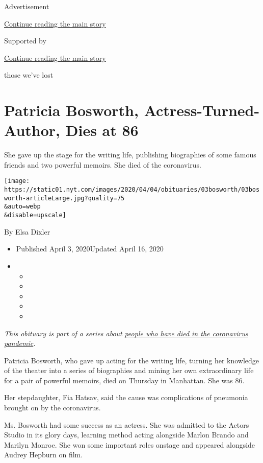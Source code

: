 Advertisement

\protect\hyperlink{after-top}{Continue reading the main story}

Supported by

\protect\hyperlink{after-sponsor}{Continue reading the main story}

those we've lost

\hypertarget{patricia-bosworth-actress-turned-author-dies-at-86}{%
\section{Patricia Bosworth, Actress-Turned-Author, Dies at
86}\label{patricia-bosworth-actress-turned-author-dies-at-86}}

She gave up the stage for the writing life, publishing biographies of
some famous friends and two powerful memoirs. She died of the
coronavirus.

\texttt{[image: https://static01.nyt.com/images/2020/04/04/obituaries/03bosworth/03bosworth-articleLarge.jpg?quality=75\\\&auto=webp\\\&disable=upscale]}

By Elsa Dixler

\begin{itemize}
\item
  Published April 3, 2020Updated April 16, 2020
\item
  \begin{itemize}
  \item
  \item
  \item
  \item
  \item
  \end{itemize}
\end{itemize}

\emph{This obituary is part of a series about}
\href{https://www.nytimes.com/series/people-who-have-died-of-the-coronavirus}{\emph{people
who have died in the coronavirus pandemic}}\emph{.}

Patricia Bosworth, who gave up acting for the writing life, turning her
knowledge of the theater into a series of biographies and mining her own
extraordinary life for a pair of powerful memoirs, died on Thursday in
Manhattan. She was 86.

Her stepdaughter, Fia Hatsav, said the cause was complications of
pneumonia brought on by the coronavirus.

Ms. Bosworth had some success as an actress. She was admitted to the
Actors Studio in its glory days, learning method acting alongside Marlon
Brando and Marilyn Monroe. She won some important roles onstage and
appeared alongside Audrey Hepburn on film.


